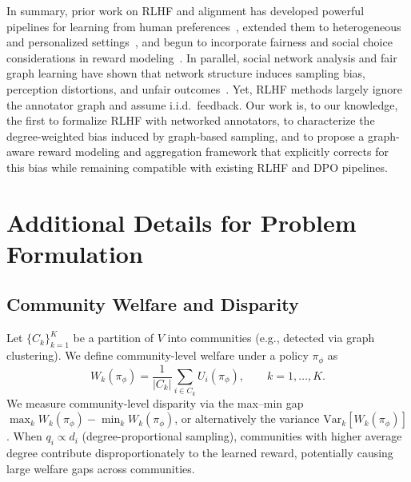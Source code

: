 \documentclass{article}
\theoremstyle{plain}
\theoremstyle{definition}
\theoremstyle{remark}
\begin{document}
In summary, prior work on RLHF and alignment has developed powerful pipelines for learning from human preferences~\citep{ouyang2022instructgpt,rafailov2023dpo,kaufmann2025survey,lambert2025rlhfbook,shen2023llmalignment}, extended them to heterogeneous and personalized settings~\citep{poddar2024vpl,li2024personalized_rlhf,liu2025shared_lora_prlhf,shenfeld2025reward_factorization,guan2025personalized_alignment_survey}, and begun to incorporate fairness and social choice considerations in reward modeling~\citep{chakraborty2024maxminrlhf,ramesh2024grpo,li2024optimizing_fair_stable,ouyang2025rewardfairness,song2025groupfair_rewardmodels,choi2025faro,ge2024axioms,dai2024mapping,conitzer2024socialchoice,halpern2025pairwise_calibrated,dumoulin2024density_pairwise}.
In parallel, social network analysis and fair graph learning have shown that network structure induces sampling bias, perception distortions, and unfair outcomes~\citep{wejnert2010rds,lerman2016majorityillusion,antunes2024minorityranking,dong2021edits,saxena2024fairsna,chen2023fairgnn_survey,laclau2024fairness_graphs_survey,wang2025fairgnn_wod}.
Yet, RLHF methods largely ignore the annotator graph and assume i.i.d.\ feedback.
Our work is, to our knowledge, the first to formalize RLHF with networked annotators, to characterize the degree-weighted bias induced by graph-based sampling, and to propose a graph-aware reward modeling and aggregation framework that explicitly corrects for this bias while remaining compatible with existing RLHF and DPO pipelines.

\section{Additional Details for Problem Formulation}
\label{app:problem-details}

\subsection{Community Welfare and Disparity}
\label{app:community-welfare}

Let $\{C_k\}_{k=1}^K$ be a partition of $V$ into communities (e.g., detected via graph clustering). We define community-level welfare under a policy $\pi_\phi$ as
\begin{equation}
    W_k(\pi_\phi)
    =
    \frac{1}{|C_k|}
    \sum_{i \in C_k} U_i(\pi_\phi),
    \qquad
    k = 1,\dots,K.
    \label{eq:community-welfare}
\end{equation}
We measure community-level disparity via the max--min gap $\max_k W_k(\pi_\phi) - \min_k W_k(\pi_\phi)$, or alternatively the variance $\mathrm{Var}_k[W_k(\pi_\phi)]$. When $q_i \propto d_i$ (degree-proportional sampling), communities with higher average degree contribute disproportionately to the learned reward, potentially causing large welfare gaps across communities.
\end{document}
